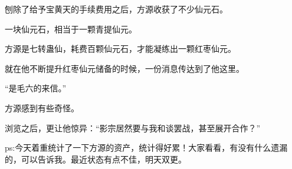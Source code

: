 \begin{this_body}
刨除了给予宝黄天的手续费用之后，方源收获了不少仙元石。

一块仙元石，相当于一颗青提仙元。

方源是七转蛊仙，耗费百颗仙元石，才能凝练出一颗红枣仙元。

就在他不断提升红枣仙元储备的时候，一份消息传达到了他这里。

“是毛六的来信。”

方源感到有些奇怪。

浏览之后，更让他惊异：“影宗居然要与我和谈罢战，甚至展开合作？”

ps:今天着重统计了一下方源的资产，统计得好累！大家看看，有没有什么遗漏的，可以告诉我。最近状态有点不佳，明天双更。

\end{this_body}

